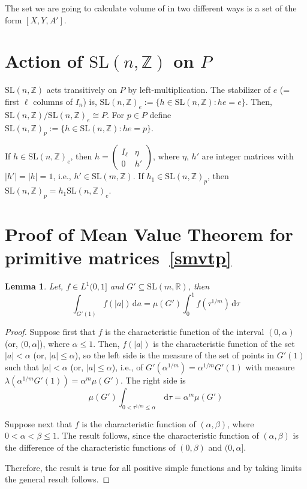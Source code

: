\documentclass[11pt]{article}
\newtheorem{lemma}[theorem]{Lemma}
\theoremstyle{definition}
\begin{document}
The set we are going to calculate volume of in two different ways is a set of the form $[X,Y,A']$.

\section{Action of $\mathrm{SL}(n, \mathbb{Z})$ on $P$}
$\mathrm{SL}(n, \mathbb{Z})$ acts transitively on $P$ by left-multiplication.
The stabilizer of $e$ (= first $\ell$ columns of $I_n $) is, ${\mathrm{SL}(n, \mathbb{Z})}_e := \{h \in \mathrm{SL}(n, \mathbb{Z}): he = e\}$.
Then, $\mathrm{SL}(n, \mathbb{Z}) / {\mathrm{SL}(n, \mathbb{Z})}_e \cong P $.
For $p \in P$ define ${\mathrm{SL}(n, \mathbb{Z})}_p := \{h \in \mathrm{SL}(n, \mathbb{Z}): he = p\}$.

If $h \in {\mathrm{SL}(n, \mathbb{Z})}_e$, then $h=
\begin{pmatrix}
    I_\ell & \eta   \\
    0      & h'
\end{pmatrix}
$, where $\eta$, $h'$ are integer matrices with $|h'|=|h|=1$, i.e., $h' \in \mathrm{SL}(m,\mathbb{Z})$.
If $h_1 \in {\mathrm{SL}(n, \mathbb{Z})}_p$, then ${\mathrm{SL}(n,\mathbb{Z})}_p = h_1 {\mathrm{SL}(n, \mathbb{Z})}_e$.

\section{Proof of Mean Value Theorem for primitive matrices~\ref{smvtp}}\label{sec1.8}
\begin{lemma}\label{lem1.8.1}
    Let, $f \in L^1(0,1]$ and $G' \subseteq \mathrm{SL}(m, \mathbb{R})$, then
    \[	
        \int_{G'(1)} f(|a|) \, \mathrm{d} a = \mu (G') \int_{0}^{1} f( \tau ^{1/m}) \, \mathrm{d} \tau
    \]
\end{lemma}
\begin{proof}
    Suppose first that $f$ is the characteristic function of the interval $(0,\alpha )$ (or, $(0, \alpha ]$), where $\alpha \leq 1$.
    Then, $f(|a|)$ is the characteristic function of the set $|a| < \alpha $ (or, $|a| \leq \alpha $), so the left side is the measure of the set of points in $G'(1)$ such that $|a| < \alpha $ (or, $|a| \leq \alpha $), i.e., of $G'(\alpha ^{1/m})= \alpha ^{1/m}G'(1)$ with measure $\lambda(\alpha ^{1/m} G'(1))= \alpha ^m \mu (G')$.
    The right side is
    \[	
        \mu (G') \int_{0 < \tau ^{1/m} \le \alpha } \, \mathrm{d} \tau = \alpha ^m \mu (G')
    \]

    Suppose next that $f$ is the characteristic function of $(\alpha , \beta )$, where $0 < \alpha < \beta \le 1$.
    The result follows, since the characteristic function of $(\alpha , \beta )$ is the difference of the characteristic functions of $(0, \beta )$ and $(0, \alpha ]$.

    Therefore, the result is true for all positive simple functions and by taking limits the general result follows.
\end{proof}
\end{document}
